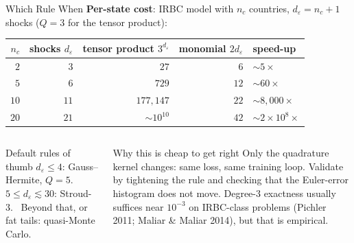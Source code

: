 \documentclass[aspectratio=169,11pt]{beamer}
\newcommand{\emphc}[1]{\textcolor{harvardcrimson}{#1}}
\begin{document}
\begin{frame}{Which Rule When}
\textbf{Per-state cost}: IRBC model with $n_c$ countries, $d_\varepsilon = n_c+1$ shocks ($Q=3$ for the tensor product):
\begin{center}
\renewcommand{\arraystretch}{1.05}
\footnotesize
\begin{tabular}{@{}rrrrl@{}}
\toprule
$n_c$ & shocks $d_\varepsilon$ & tensor product $3^{d_\varepsilon}$ & monomial $2d_\varepsilon$ & speed-up\\
\midrule
$2$  & $3$  & $27$           & $6$   & $\sim\! 5\times$\\
$5$  & $6$  & $729$          & $12$  & $\sim\! 60\times$\\
$10$ & $11$ & $177{,}147$    & $22$  & $\sim\! 8{,}000\times$\\
$20$ & $21$ & $\sim\! 10^{10}$ & $42$  & $\sim\! 2\!\times\!10^8\times$\\
\bottomrule
\end{tabular}
\end{center}

\begin{columns}[T]
\begin{block}{Default rules of thumb}
\footnotesize
$d_\varepsilon \le 4$: Gauss--Hermite, $Q=5$. \ $5 \le d_\varepsilon \lesssim 30$: Stroud-3. \ Beyond that, or fat tails: quasi-Monte Carlo.
\end{block}

\begin{exampleblock}{Why this is cheap to get right}
\footnotesize
Only the quadrature \emphc{kernel} changes: same loss, same training loop. Validate by tightening the rule and checking that the Euler-error histogram does not move. Degree-3 exactness usually suffices near $10^{-3}$ on IRBC-class problems (Pichler 2011; Maliar \& Maliar 2014), but that is empirical.
\end{exampleblock}
\end{columns}
\end{frame}
\end{document}
